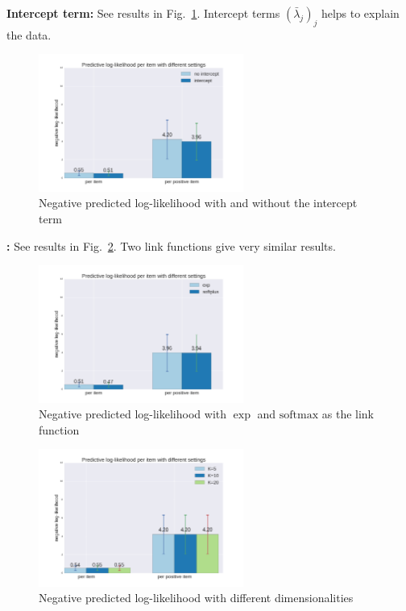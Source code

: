 \documentclass{article}
\begin{document}
{\bf Intercept term: } See results in Fig.~\ref{fig_intercept_term}. Intercept terms $(\bar{\lambda}_j)_j$ helps to explain the data. 
\begin{figure}[t]
    \centering
    \includegraphics[width=0.6\textwidth]{figures/intercept_term.png}
    \caption{Negative predicted log-likelihood with and without the intercept term}
    \label{fig_intercept_term}
\end{figure}



{\bf : } See results in Fig.~\ref{fig_link_func}. Two link functions give very similar results. 
\begin{figure}[t]
    \centering
    \includegraphics[width=0.6\textwidth]{figures/link_func.png}
    \caption{Negative predicted log-likelihood with $\exp$ and $\mathrm{softmax}$ as the link function}
    \label{fig_link_func}
\end{figure}

\begin{figure}[t]
    \centering
    \includegraphics[width=0.6\textwidth]{figures/variate_K.png}
    \caption{Negative predicted log-likelihood with different dimensionalities}
    \label{fig_dimensionality}
\end{figure}
\end{document}
